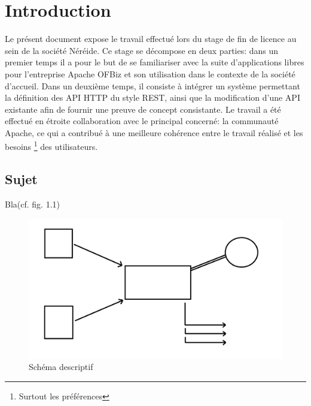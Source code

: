 \chapter{Introduction}

Le présent document expose le travail effectué lors du stage de fin de licence au sein de la société Néréide. Ce stage se décompose en deux parties: dans un premier temps il a pour le but de se familiariser avec la suite d'applications libres pour l'entreprise  Apache OFBiz et son utilisation dans le contexte de la société d'accueil. Dans un deuxième temps, il consiste à intégrer un système permettant la définition des API HTTP du style REST, ainsi que la modification d'une API existante afin de fournir une preuve de concept consistante. Le travail a été effectué en étroite collaboration avec le principal concerné: la communauté Apache, ce qui a contribué à une meilleure cohérence entre le travail réalisé et les besoins \footnote{Surtout les préférences} des utilisateurs.



























\iffalse
\section{Sujet}

Bla(cf. fig. 1.1)\\

\begin{figure}[!h]
\begin{center}
\includegraphics[width=15cm]{presentation/schema}
\end{center}
\caption{Schéma descriptif}
\end{figure}

